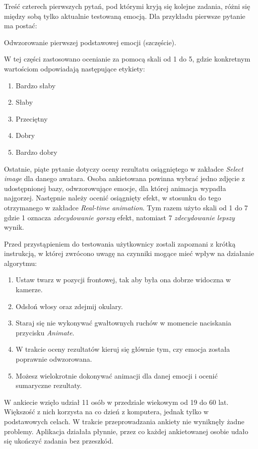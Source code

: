 Treść czterech pierwszych pytań, pod którymi kryją się kolejne zadania, różni się między sobą tylko aktualnie testowaną emocją. Dla przykładu pierwsze pytanie ma postać:
\begin{center}
    Odwzorowanie pierwszej podstawowej emocji (szczęście).
\end{center}

W tej części zastosowano ocenianie za pomocą skali od 1 do 5, gdzie konkretnym wartościom odpowiadają następujące etykiety:
\begin{enumerate}
    \item Bardzo słaby
    \item Słaby
    \item Przeciętny
    \item Dobry
    \item Bardzo dobry

\end{enumerate}

Ostatnie, piąte pytanie dotyczy oceny rezultatu osiągniętego w zakładce \textit{Select image} dla danego awatara. Osoba ankietowana powinna wybrać jedno zdjęcie z udostępnionej bazy, odwzorowujące emocje, dla której animacja wypadła najgorzej. Następnie należy ocenić osiągnięty efekt, w stosunku do tego otrzymanego w zakładce \textit{Real-time animation}. Tym razem użyto skali od 1 do 7 gdzie 1 oznacza \textit{zdecydowanie gorszy} efekt, natomiast 7 \textit{zdecydowanie lepszy} wynik.

Przed przystąpieniem do testowania użytkownicy zostali zapoznani z krótką instrukcją, w której zwrócono uwagę na czynniki mogące mieć wpływ na działanie algorytmu:

\begin{enumerate}
    \item Ustaw twarz w pozycji frontowej, tak aby była ona dobrze widoczna w kamerze.
    \item Odsłoń włosy oraz zdejmij okulary.
    \item Staraj się nie wykonywać gwałtownych ruchów w momencie naciskania przycisku \textit{Animate}.
    \item W trakcie oceny rezultatów kieruj się głównie tym, czy emocja została poprawnie odwzorowana.
    \item Możesz wielokrotnie dokonywać animacji dla danej emocji i ocenić sumaryczne rezultaty.
\end{enumerate}

W ankiecie wzięło udział 11 osób w przedziale wiekowym od 19 do 60 lat. Większość z nich korzysta na co dzień z komputera, jednak tylko w podstawowych celach. W trakcie przeprowadzania ankiety nie wyniknęły żadne problemy. Aplikacja działała płynnie, przez co każdej ankietowanej osobie udało się ukończyć zadania bez przeszkód.

